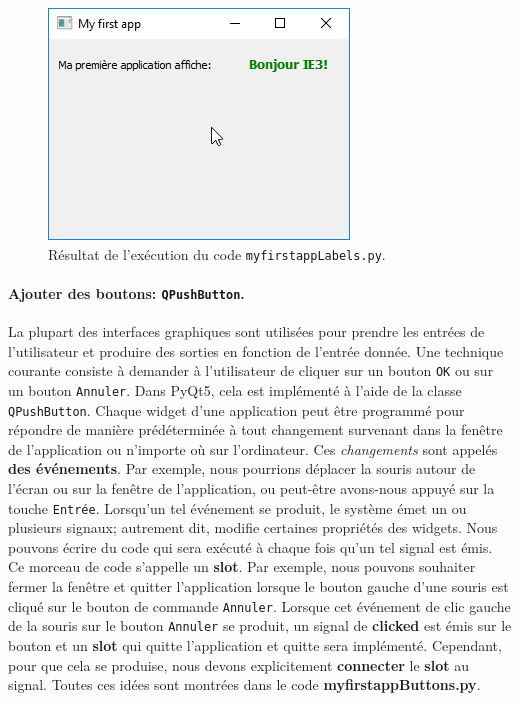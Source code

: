 \documentclass[%
oneside,                 %
final,                   %
10pt,french]{article}
\begin{document}
\begin{figure}[!ht]  %
  \centerline{\includegraphics[width=0.4\linewidth]{imgs/myfirstappLabels.png}}
  \caption{
  Résultat de l'exécution du code \texttt{myfirstappLabels.py}. \label{fig:myfirstappLabels}
  }
\end{figure}


\paragraph{Ajouter des boutons: \texttt{QPushButton}.}
La plupart des interfaces graphiques sont utilisées pour prendre les entrées de l'utilisateur et produire des sorties en fonction de l'entrée donnée. Une technique courante consiste à demander à l'utilisateur de cliquer sur un bouton \texttt{OK} ou sur un bouton \texttt{Annuler}. Dans PyQt5, cela est implémenté à l'aide de la classe \texttt{QPushButton}. Chaque widget d'une application peut être programmé pour répondre de manière prédéterminée à tout changement survenant dans la fenêtre de l'application ou n'importe où sur l'ordinateur. Ces \emph{changements} sont appelés \textbf{des événements}. Par exemple, nous pourrions déplacer la souris autour de l'écran ou sur la fenêtre de l'application, ou peut-être avons-nous appuyé sur la touche \texttt{Entrée}. Lorsqu'un tel événement se produit, le système émet un ou plusieurs signaux; autrement dit, modifie certaines propriétés des widgets. Nous pouvons écrire du code qui sera exécuté à chaque fois qu'un tel signal est émis. Ce morceau de code s'appelle un \textbf{slot}. Par exemple, nous pouvons souhaiter fermer la fenêtre et quitter l’application lorsque le bouton gauche d’une souris est cliqué sur le bouton de commande \texttt{Annuler}. Lorsque cet événement de clic gauche de la souris sur le bouton \texttt{Annuler} se produit, un signal de \textbf{clicked} est émis sur le bouton et un \textbf{slot} qui quitte l'application et quitte sera implémenté. Cependant, pour que cela se produise, nous devons explicitement \textbf{connecter} le \textbf{slot} au signal. Toutes ces idées sont montrées dans le code \textbf{myfirstappButtons.py}.
\end{document}
